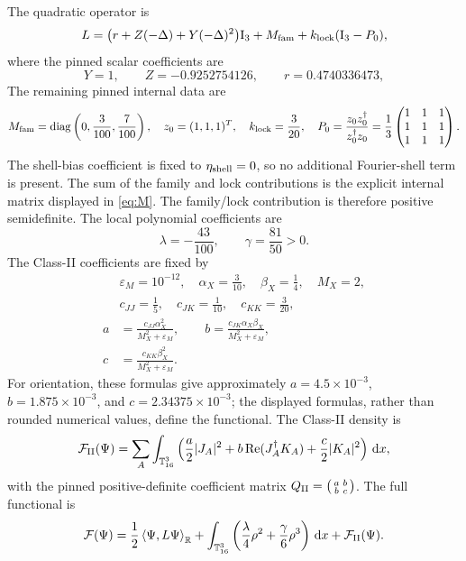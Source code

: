 \documentclass[11pt]{article}
\numberwithin{equation}{section}
\theoremstyle{definition}
\newcommand{\T}{\mathbb T}
\newcommand{\R}{\mathbb R}
\newcommand{\cF}{\mathcal F}
\newcommand{\Id}{\mathrm I}
\newcommand{\dd}{\,\mathrm d}
\newcommand{\ip}[2]{\left\langle #1,#2\right\rangle}
\begin{document}
The quadratic operator is
\begin{equation}
 L=\bigl(r+Z(-\Delta)+Y(-\Delta)^2\bigr)\Id_3+M_{\rm fam}
       +k_{\rm lock}(\Id_3-P_0),
 \label{eq:L}
\end{equation}
where the pinned scalar coefficients are
\begin{equation}
 Y=1,\qquad Z=-0.9252754126,\qquad r=0.4740336473,
 \label{eq:scalar-coeff}
\end{equation}
The remaining pinned internal data are
\begin{equation}
 M_{\rm fam}=\operatorname{diag}\left(0,\frac{3}{100},\frac{7}{100}\right),\quad
 z_0=(1,1,1)^T,\quad k_{\rm lock}=\frac{3}{20},\quad
 P_0=\frac{z_0z_0^\dagger}{z_0^\dagger z_0}=\frac13\begin{pmatrix}1&1&1\\1&1&1\\1&1&1\end{pmatrix}.
 \label{eq:internal-data}
\end{equation}
The shell-bias coefficient is fixed to \(\eta_{\rm shell}=0\), so no additional
Fourier-shell term is present.  The sum of the family and lock contributions
is the explicit internal matrix displayed in \eqref{eq:M}.  The family/lock
contribution is therefore positive semidefinite.  The local
polynomial coefficients are
\begin{equation}
 \lambda=-\frac{43}{100},\qquad \gamma=\frac{81}{50}>0.
 \label{eq:local-coeff}
\end{equation}
The Class-II coefficients are fixed by
\begin{equation}
\begin{aligned}
 &\varepsilon_M=10^{-12},\quad \alpha_X=\frac{3}{10},\quad
   \beta_X=\frac14,\quad M_X=2,\\
 &c_{JJ}=\frac15,\quad c_{JK}=\frac1{10},\quad c_{KK}=\frac3{20},\\
 a&=\frac{c_{JJ}\alpha_X^2}{M_X^2+\varepsilon_M},\qquad
 b=\frac{c_{JK}\alpha_X\beta_X}{M_X^2+\varepsilon_M},\\
 c&=\frac{c_{KK}\beta_X^2}{M_X^2+\varepsilon_M}.
\end{aligned}
\label{eq:classii-coeff}
\end{equation}
For orientation, these formulas give approximately
\(a=4.5\times10^{-3}\), \(b=1.875\times10^{-3}\), and
\(c=2.34375\times10^{-3}\); the displayed formulas, rather than rounded
numerical values, define the functional.  The Class-II density is
\begin{equation}
 \cF_{\rm II}(\Psi)=\sum_A\int_{\T^3_{16}}
 \left(\frac a2|J_A|^2+b\operatorname{Re}(J_A^\dagger K_A)
                  +\frac c2|K_A|^2\right)\dd x,
 \label{eq:classii}
\end{equation}
with the pinned positive-definite coefficient matrix
$Q_{\rm II}=\left(\begin{smallmatrix}a&b\\b&c\end{smallmatrix}\right)$.
The full functional is
\begin{equation}
 \cF(\Psi)=\frac12\ip{\Psi}{L\Psi}_{\R}
 +\int_{\T^3_{16}}\left(\frac\lambda4\rho^2+\frac\gamma6\rho^3\right)\dd x
 +\cF_{\rm II}(\Psi).
 \label{eq:functional}
\end{equation}
\end{document}
